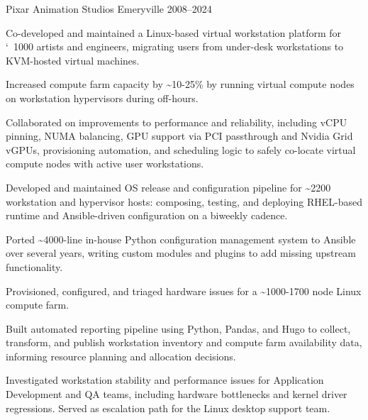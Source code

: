   \cventryflow
  {
  }
  {Pixar Animation Studios}
  {Emeryville}
  {2008--2024}
  {
    \begin{cvitems}
    \item Co-developed and maintained a Linux-based virtual workstation platform for \char`~1000 artists and engineers, migrating users from under-desk workstations to KVM-hosted virtual machines.
    \item Increased compute farm capacity by \~{}10-25\% by running virtual compute nodes on workstation hypervisors during off-hours.
    \item Collaborated on improvements to performance and reliability, including vCPU pinning, NUMA balancing, GPU support via PCI passthrough and Nvidia Grid vGPUs, provisioning automation, and scheduling logic to safely co-locate virtual compute nodes with active user workstations.
    \item Developed and maintained OS release and configuration pipeline for \~{}2200 workstation and hypervisor hosts: composing, testing, and deploying RHEL-based runtime and Ansible-driven configuration on a biweekly cadence.
    \item Ported \~{}4000-line in-house Python configuration management system to Ansible over several years, writing custom modules and plugins to add missing upstream functionality.
    \item Provisioned, configured, and triaged hardware issues for a \~{}1000-1700 node Linux compute farm.
    \item Built automated reporting pipeline using Python, Pandas, and Hugo to collect, transform, and publish workstation inventory and compute farm availability data, informing resource planning and allocation decisions.
    \item Investigated workstation stability and performance issues for Application Development and QA teams,
      including hardware bottlenecks and kernel driver regressions. Served as escalation path for the Linux desktop support team.
    \end{cvitems}
  }

